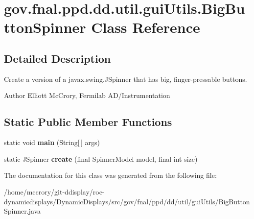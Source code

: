 \hypertarget{classgov_1_1fnal_1_1ppd_1_1dd_1_1util_1_1guiUtils_1_1BigButtonSpinner}{\section{gov.\-fnal.\-ppd.\-dd.\-util.\-gui\-Utils.\-Big\-Button\-Spinner Class Reference}
\label{classgov_1_1fnal_1_1ppd_1_1dd_1_1util_1_1guiUtils_1_1BigButtonSpinner}
}


\subsection{Detailed Description}
Create a version of a javax.\-swing.\-J\-Spinner that has big, finger-\/pressable buttons.

\begin{DoxyAuthor}{Author}
Elliott Mc\-Crory, Fermilab A\-D/\-Instrumentation 
\end{DoxyAuthor}
\subsection*{Static Public Member Functions}
\begin{DoxyCompactItemize}
\item 
\hypertarget{classgov_1_1fnal_1_1ppd_1_1dd_1_1util_1_1guiUtils_1_1BigButtonSpinner_aeadaef752842508587c3591191772b4c}{static void {\bfseries main} (String\mbox{[}$\,$\mbox{]} args)}\label{classgov_1_1fnal_1_1ppd_1_1dd_1_1util_1_1guiUtils_1_1BigButtonSpinner_aeadaef752842508587c3591191772b4c}

\item 
\hypertarget{classgov_1_1fnal_1_1ppd_1_1dd_1_1util_1_1guiUtils_1_1BigButtonSpinner_a7445f7ddf331e4ccfd63df927fef8a34}{static J\-Spinner {\bfseries create} (final Spinner\-Model model, final int size)}\label{classgov_1_1fnal_1_1ppd_1_1dd_1_1util_1_1guiUtils_1_1BigButtonSpinner_a7445f7ddf331e4ccfd63df927fef8a34}

\end{DoxyCompactItemize}


The documentation for this class was generated from the following file\-:\begin{DoxyCompactItemize}
\item 
/home/mccrory/git-\/ddisplay/roc-\/dynamicdisplays/\-Dynamic\-Displays/src/gov/fnal/ppd/dd/util/gui\-Utils/Big\-Button\-Spinner.\-java\end{DoxyCompactItemize}
